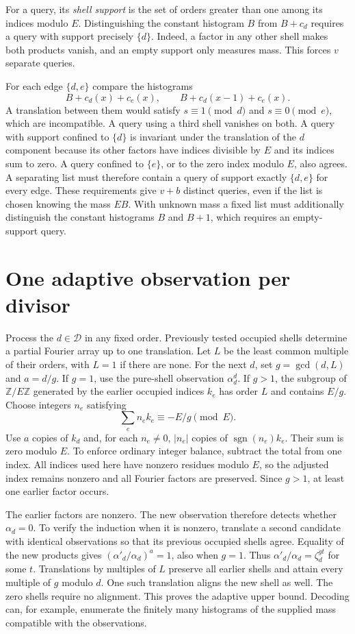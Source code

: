 \documentclass[11pt]{article}
\newcommand{\Z}{\mathbb Z}\newcommand{\Q}{\mathbb Q}\newcommand{\D}{\mathcal D}
\begin{document}
For a query, its \emph{shell support} is the set of orders greater than one among its indices modulo $E$. Distinguishing the constant histogram $B$ from $B+c_d$ requires a query with support precisely $\{d\}$. Indeed, a factor in any other shell makes both products vanish, and an empty support only measures mass. This forces $v$ separate queries.

For each edge $\{d,e\}$ compare the histograms
\[
 B+c_d(x)+c_e(x),\qquad B+c_d(x-1)+c_e(x).
\]
A translation between them would satisfy $s\equiv1\pmod d$ and $s\equiv0\pmod e$, which are incompatible. A query using a third shell vanishes on both. A query with support confined to $\{d\}$ is invariant under the translation of the $d$ component because its other factors have indices divisible by $E$ and its indices sum to zero. A query confined to $\{e\}$, or to the zero index modulo $E$, also agrees. A separating list must therefore contain a query of support exactly $\{d,e\}$ for every edge. These requirements give $v+b$ distinct queries, even if the list is chosen knowing the mass $EB$. With unknown mass a fixed list must additionally distinguish the constant histograms $B$ and $B+1$, which requires an empty-support query.

\section{One adaptive observation per divisor}
Process the $d\in\D$ in any fixed order. Previously tested occupied shells determine a partial Fourier array up to one translation. Let $L$ be the least common multiple of their orders, with $L=1$ if there are none. For the next $d$, set $g=\gcd(d,L)$ and $a=d/g$. If $g=1$, use the pure-shell observation $\alpha_d^d$. If $g>1$, the subgroup of $\Z/E\Z$ generated by the earlier occupied indices $k_e$ has order $L$ and contains $E/g$. Choose integers $n_e$ satisfying
\[
 \sum_e n_e k_e\equiv -E/g\pmod E .
\]
Use $a$ copies of $k_d$ and, for each $n_e\ne0$, $|n_e|$ copies of $\operatorname{sgn}(n_e)k_e$. Their sum is zero modulo $E$. To enforce ordinary integer balance, subtract the total from one index. All indices used here have nonzero residues modulo $E$, so the adjusted index remains nonzero and all Fourier factors are preserved. Since $g>1$, at least one earlier factor occurs.

The earlier factors are nonzero. The new observation therefore detects whether $\alpha_d=0$. To verify the induction when it is nonzero, translate a second candidate with identical observations so that its previous occupied shells agree. Equality of the new products gives $(\alpha'_d/\alpha_d)^a=1$, also when $g=1$. Thus $\alpha'_d/\alpha_d=\zeta_d^{gt}$ for some $t$. Translations by multiples of $L$ preserve all earlier shells and attain every multiple of $g$ modulo $d$. One such translation aligns the new shell as well. The zero shells require no alignment. This proves the adaptive upper bound. Decoding can, for example, enumerate the finitely many histograms of the supplied mass compatible with the observations.
\end{document}
